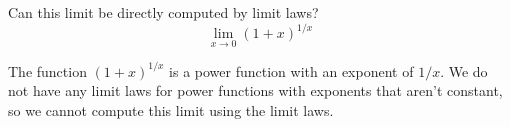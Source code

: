 \documentclass{ximera}
\begin{document}
\begin{question}
  Can this limit be directly computed by limit laws?
  \[
  \displaystyle\lim_{x\to 0}(1+x)^{1/x}
  \]
  \begin{multipleChoice}
  \end{multipleChoice}
  \begin{feedback}
  The function $(1+x)^{1/x}$ is a power function with an exponent of $1/x$.  We do not have any limit laws for power functions with exponents that aren't constant, so we cannot compute this limit using the limit laws.
  \end{feedback}
\end{question}
\end{document}
